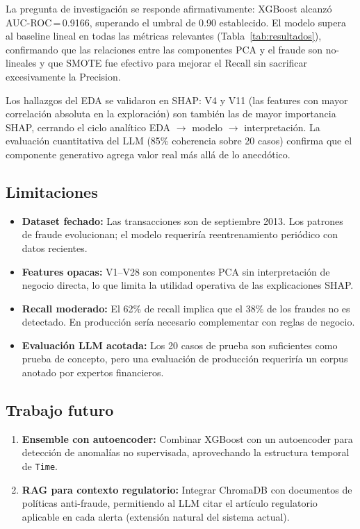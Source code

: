 \documentclass[10pt,twocolumn]{article}
\begin{document}
La pregunta de investigación se responde afirmativamente: XGBoost
alcanzó AUC-ROC\,=\,0.9166, superando el umbral de 0.90 establecido.
El modelo supera al baseline lineal en todas las métricas relevantes
(Tabla~\ref{tab:resultados}), confirmando que las relaciones entre las
componentes PCA y el fraude son no-lineales y que SMOTE fue efectivo
para mejorar el Recall sin sacrificar excesivamente la Precision.

Los hallazgos del EDA se validaron en SHAP: V4 y V11 (las features
con mayor correlación absoluta en la exploración) son también las de
mayor importancia SHAP, cerrando el ciclo analítico EDA $\rightarrow$
modelo $\rightarrow$ interpretación. La evaluación cuantitativa del LLM
(85\% coherencia sobre 20 casos) confirma que el componente generativo
agrega valor real más allá de lo anecdótico.

\subsection{Limitaciones}

\begin{itemize}[leftmargin=*,topsep=2pt,itemsep=1pt]
  \item \textbf{Dataset fechado:} Las transacciones son de septiembre
        2013. Los patrones de fraude evolucionan; el modelo requeriría
        reentrenamiento periódico con datos recientes.
  \item \textbf{Features opacas:} V1--V28 son componentes PCA sin
        interpretación de negocio directa, lo que limita la utilidad
        operativa de las explicaciones SHAP.
  \item \textbf{Recall moderado:} El 62\% de recall implica que el
        38\% de los fraudes no es detectado. En producción sería
        necesario complementar con reglas de negocio.
  \item \textbf{Evaluación LLM acotada:} Los 20 casos de prueba son
        suficientes como prueba de concepto, pero una evaluación de
        producción requeriría un corpus anotado por expertos financieros.
\end{itemize}

\subsection{Trabajo futuro}

\begin{enumerate}[leftmargin=*,topsep=2pt,itemsep=2pt]
  \item \textbf{Ensemble con autoencoder:} Combinar XGBoost con un
        autoencoder para detección de anomalías no supervisada,
        aprovechando la estructura temporal de \texttt{Time}.
  \item \textbf{RAG para contexto regulatorio:} Integrar ChromaDB
        con documentos de políticas anti-fraude, permitiendo al LLM
        citar el artículo regulatorio aplicable en cada alerta
        (extensión natural del sistema actual).
\end{enumerate}
\end{document}
